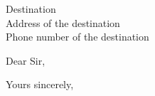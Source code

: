 \documentclass[a4paper,11pt]{letter}
\begin{document}
\begin{letter}{Destination\\Address of the destination\\Phone number of the destination}
	
\opening{Dear Sir,}


\closing{Yours sincerely,}


\end{letter}
\end{document}
